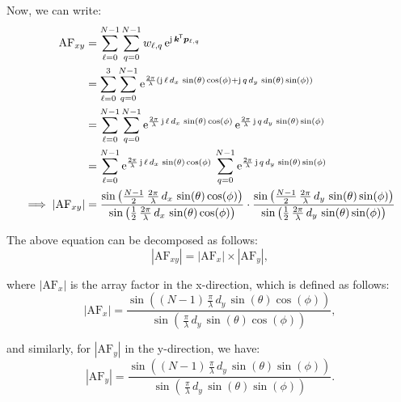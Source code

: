 \documentclass[12pt,onecolumn,a4paper]{article}
\newcommand*{\transpose}{{\mkern-1.5mu\mathsf{T}}}
\begin{document}
	Now, we can write:
\begin{align}
	\text{AF}_{xy} &= \sum_{\ell=0}^{N-1} \sum_{q=0}^{N-1} w_{\ell,q} \, \mathrm{e}^{\mathrm{j} \, \bm{k}^\transpose \bm{p}_{\ell,q}}\\
	&= \sum_{\ell=0}^{3} \sum_{q=0}^{N-1} \mathrm{e}^{\frac{2\pi}{\lambda} \left( \mathrm{j} \, \ell \, d_x \, \sin(\theta) \cos(\phi) + \mathrm{j} \, q \, d_y \, \sin(\theta) \sin(\phi) \right)} \\
	&= \sum_{\ell=0}^{N-1} \sum_{q=0}^{N-1} \mathrm{e}^{\frac{2\pi}{\lambda} \, \mathrm{j} \, \ell \, d_x \, \sin(\theta) \cos(\phi)} \, \mathrm{e}^{\frac{2\pi}{\lambda} \, \mathrm{j} \, q \, d_y \, \sin(\theta) \sin(\phi)} \\
	&= \sum_{\ell=0}^{N-1} \mathrm{e}^{\frac{2\pi}{\lambda} \, \mathrm{j} \, \ell \, d_x \, \sin(\theta) \cos(\phi)} \, \sum_{q=0}^{N-1} \mathrm{e}^{\frac{2\pi}{\lambda} \, \mathrm{j} \, q \, d_y \, \sin(\theta) \sin(\phi)} \\
	\implies |\text{AF}_{xy}| &= 
	\frac{\sin \left( \frac{N-1}{2} \, \frac{2\pi}{\lambda} \, d_x \, \sin(\theta) \cos(\phi) \right)}
	{\sin \left( \frac{1}{2} \, \frac{2\pi}{\lambda} \, d_x \, \sin(\theta) \cos(\phi) \right)} 
	\cdot
	\frac{\sin \left( \frac{N-1}{2} \, \frac{2\pi}{\lambda} \, d_y \, \sin(\theta) \sin(\phi) \right)}
	{\sin \left( \frac{1}{2} \, \frac{2\pi}{\lambda} \, d_y \, \sin(\theta) \sin(\phi) \right)}
\end{align}

The above equation can be decomposed as follows:
	\begin{equation}
			|\text{AF}_{xy}| = |\text{AF}_x| \times |\text{AF}_y|,
	\end{equation}
	
where $|\text{AF}_x|$ is the array factor in the x-direction, which is defined as follows:
	\begin{equation}
		|\text{AF}_x| = 
		\frac{\sin \left( ({N-1}) \, \frac{\pi}{\lambda} \, d_y \, \sin(\theta) \cos(\phi) \right)}
		{\sin \left( \, \frac{\pi}{\lambda} \, d_y \, \sin(\theta) \cos(\phi) \right)},
	\end{equation}
	
	and similarly, for $|\text{AF}_y|$ in the y-direction, we have:
	\begin{equation}
		|\text{AF}_y| = 
		\frac{\sin \left( ({N-1}) \, \frac{\pi}{\lambda} \, d_y \, \sin(\theta) \sin(\phi) \right)}
		{\sin \left( \, \frac{\pi}{\lambda} \, d_y \, \sin(\theta) \sin(\phi) \right)}.
	\end{equation}
\end{document}
